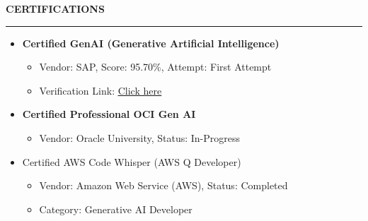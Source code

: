 \documentclass[a4paper]{article}
\begin{document}
\begin{center}
  \textbf{CERTIFICATIONS}
  \rule{\textwidth}{0.4pt}  %
\end{center}

\begin{itemize}

  \item
  \begin{minipage}[t]{\textwidth}
    \textbf{Certified GenAI (Generative Artificial Intelligence)}
    \hfill
  \end{minipage}

  \begin{itemize}
    \item Vendor: SAP, Score: 95.70\%, Attempt: First Attempt
    \item Verification Link: \href{https://open.sap.com/verify/xogaz-dimeh-rybiv-foser-teted}{\ul{Click here}}
  \end{itemize}

  \item
  \begin{minipage}[t]{\textwidth}
    \textbf{Certified Professional OCI Gen AI}
    \hfill
  \end{minipage}

  \begin{itemize}
    \item Vendor: Oracle University, Status: In-Progress
  \end{itemize}
  
  \item
    Certified AWS Code Whisper (AWS Q Developer)

    \begin{itemize}
      \item Vendor: Amazon Web Service (AWS), Status: Completed
      \item
        \begin{minipage}[t]{\textwidth}
          Category: Generative AI Developer
          \hfill
        \end{minipage}
    \end{itemize}
  

\end{itemize}
\end{document}
